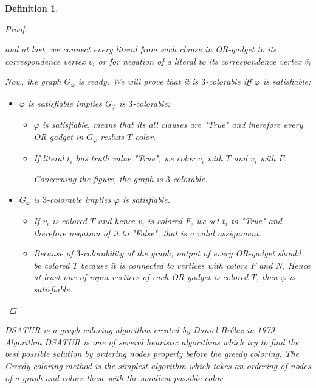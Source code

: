 \documentclass[12pt]{article}
\theoremstyle{slplain}
\newtheorem{defi}{Definition}[section]
\begin{document}
\begin{defi}
\begin{proof}
\begin{center}
\end{center}
\vspace{1cm}

and at last, we connect every literal from each clause in OR-gadget to its correspondence vertex $v_i$ or for negation of a literal to its correspondence vertex $\bar{v_i}$

Now, the graph $G_\varphi$ is ready. We will prove that it is $3$-colorable iff $\varphi$ is satisfiable:

\begin{itemize}
\item $\varphi$ is satisfiable implies $G_\varphi$ is $3$-colorable:

\begin{itemize}
\item $\varphi$ is satisfiable, means that its all clauses are "True" and therefore every OR-gadget in $G_\varphi$ resluts $T$ color. 

\item If literal $t_i$ has truth value "True", we color $v_i$ with $T$ and $\bar{v_i}$ with $F$. 

Concerning the figure, the graph is $3$-colorable. 

\end{itemize}
\item $G_\varphi$ is $3$-colorable implies $\varphi$ is satisfiable.
\begin{itemize}
\item If $v_i$ is colored $T$ and hence $\bar{v_i}$ is colored $F$, we set $t_i$ to "True" and therefore negation of it to "False", that is a valid assignment.

\item Because of $3$-colorability of the graph, output of every OR-gadget should be colored $T$ because it is connected to vertices with colors $F$ and $N$, Hence at least one of input vertices of each OR-gadget is colored $T$, then $\varphi$ is satisfiable. 
\end{itemize}
\end{itemize}

\end{proof}


DSATUR is a graph coloring algorithm created by Daniel Br\'elaz \cite{brelaz} in 1979. Algorithm DSATUR is one of several heuristic algorithms which try to find the best possible solution by ordering nodes properly before the greedy coloring. The Greedy coloring method is the simplest algorithm which takes an ordering of nodes of a graph and colors these with the smallest possible color. 


\end{defi}
\end{document}

